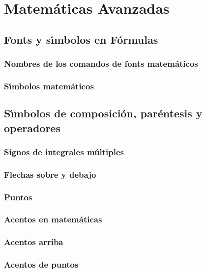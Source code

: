 \documentclass [spanish,12pt]{article}
\begin{document}
\section{Matem\'aticas Avanzadas}



\subsection{Fonts y s\'{\i}mbolos en F\'ormulas}

\subsubsection{Nombres de los comandos de fonts matem\'aticos}

\subsubsection{S\'{\i}mbolos matem\'aticos}

\subsection{S\'{\i}mbolos de composici\'on, par\'entesis y operadores}

\subsubsection{Signos de integrales m\'ultiples}

\subsubsection{Flechas sobre y debajo}

\subsubsection{Puntos}

\subsubsection{Acentos en matem\'aticas}

\subsubsection{Acentos arriba}

\subsubsection{Acentos de puntos}
\end{document}
